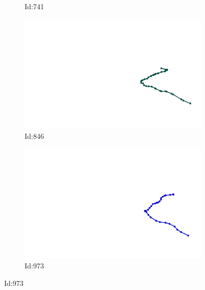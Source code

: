 \documentclass[12pt,twoside]{report}
\begin{document}
\begin{figure}
\begin{subfigure}[b]{0.20\textwidth}
\caption{Id:741}
\end{subfigure}
\begin{subfigure}[b]{0.20\textwidth}
\centering
\includegraphics[width=\textwidth]{../../trajectories/846.png}
\caption{Id:846}
\end{subfigure}
\begin{subfigure}[b]{0.20\textwidth}
\centering
\includegraphics[width=\textwidth]{../../trajectories/973.png}
\caption{Id:973}
\end{subfigure}
\end{figure}
\end{document}
